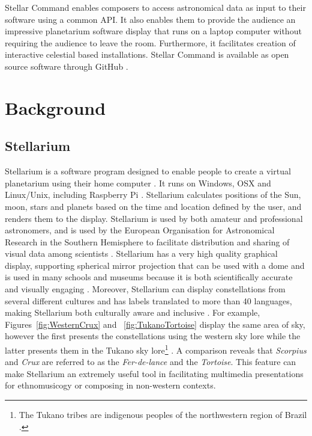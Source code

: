 \documentclass[10pt,a4paper,extrafontsizes]{memoir}
\begin{document}
Stellar Command enables composers to access astronomical data as input to their software using a common API.  It also enables them to provide the audience an impressive planetarium software display that runs on a laptop computer without requiring the audience to leave the room. Furthermore, it facilitates creation of interactive celestial based installations. Stellar Command is available as open source software through GitHub \cite{fraiettaSTELLARCOMMAND}.

\chapter{Background}
\section{Stellarium}
Stellarium is a software program designed to enable people to create a virtual planetarium using their home computer \cite{zottistellarium}. It runs on Windows, OSX and Linux/Unix, including Raspberry Pi \cite[p.~6]{zottistellarium}.  Stellarium calculates positions of the Sun, moon, stars and planets based on the time and location defined by the user, and renders them to the display.  Stellarium is used by both amateur and professional astronomers, and is used by the  European Organisation for Astronomical Research in the Southern Hemisphere to facilitate distribution and sharing of visual data among scientists \cite{berglund2008using}. Stellarium has a very high quality graphical display, supporting spherical mirror projection that can be used with a dome \cite{mc2009touring} and is used in many schools and museums because it is both scientifically accurate and visually engaging \cite{berglund2008using}.  Moreover, Stellarium can display constellations from several different cultures and has labels translated to more than 40 languages, making Stellarium both culturally aware and inclusive \cite{berglund2008using}. 
For example,  Figures~\ref{fig:WesternCrux} and ~\ref{fig:TukanoTortoise} display the same area of sky, however the first presents the constellations using the western sky lore while the latter presents them in the Tukano sky lore\footnote{The Tukano tribes are indigenous peoples of the northwestern region of Brazil \cite{KnoblochFrancis1976TTIA}.} \cite{reichel1976cosmology}. A comparison reveals that \textit{Scorpius} and \textit{Crux} are referred to as the \textit{Fer-de-lance} and the \textit{Tortoise}. This feature can make Stellarium an extremely useful tool in facilitating multimedia presentations for ethnomusicogy or composing in non-western contexts.
\end{document}
